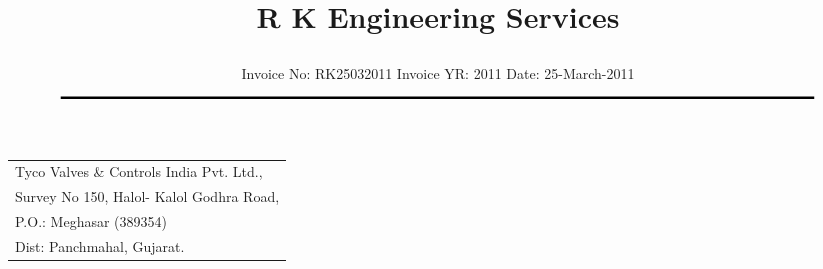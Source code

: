 \documentclass[11pt]{article}
\title{\vspace*{-1.5cm} \centerline{ \Huge \bf \hspace{0cm} R K Engineering Services}\vspace*{-0.75cm}}
\author{%
 \scriptsize Invoice No: RK25032011  \hspace*{4cm}  Invoice YR: 2011 \hspace*{4cm} Date: 25-March-2011\\
$\rule{7.5in}{0.5mm}$}
\date{}
\begin{document}
\maketitle
\thispagestyle{empty}
\vspace*{0.5cm}	
\begin{flushleft}
{\footnotesize
\begin{tabular}{l}
Tyco Valves \& Controls India Pvt. Ltd.,\\
Survey No 150, Halol- Kalol Godhra Road,\\
P.O.:  Meghasar (389354)\\
Dist: Panchmahal, Gujarat.\\
\end{tabular}
}
\end{flushleft}

\vspace*{1cm}

\vspace*{0.5cm}

\end{document}
